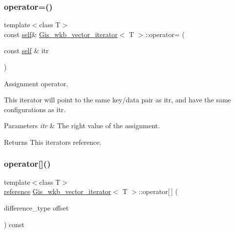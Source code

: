 \subsubsection{\texorpdfstring{operator=()}{operator=()}}
{\footnotesize\ttfamily template$<$class T$>$ \\
const \mbox{\hyperlink{classGis__wkb__vector__const__iterator}{self}}\& \mbox{\hyperlink{classGis__wkb__vector__iterator}{Gis\+\_\+wkb\+\_\+vector\+\_\+iterator}}$<$ T $>$\+::operator= (\begin{DoxyParamCaption}\item[{const \mbox{\hyperlink{classGis__wkb__vector__const__iterator}{self}} \&}]{itr }\end{DoxyParamCaption})\hspace{0.3cm}{\ttfamily [inline]}}



Assignment operator. 

This iterator will point to the same key/data pair as itr, and have the same configurations as itr. 
\begin{DoxyParams}{Parameters}
{\em itr} & The right value of the assignment. \\
\hline
\end{DoxyParams}
\begin{DoxyReturn}{Returns}
This iterator\textquotesingle{}s reference. 
\end{DoxyReturn}
\mbox{\label{classGis__wkb__vector__iterator_ad01cffdabb26e97f3024db61e24b6702}} 
\subsubsection{\texorpdfstring{operator[]()}{operator[]()}}
{\footnotesize\ttfamily template$<$class T$>$ \\
\mbox{\hyperlink{classGis__wkb__vector__const__iterator_a320ffe7a48e9c6440eb76d321ff8c5a2}{reference}} \mbox{\hyperlink{classGis__wkb__vector__iterator}{Gis\+\_\+wkb\+\_\+vector\+\_\+iterator}}$<$ T $>$\+::operator\mbox{[}$\,$\mbox{]} (\begin{DoxyParamCaption}\item[{difference\+\_\+type}]{offset }\end{DoxyParamCaption}) const\hspace{0.3cm}{\ttfamily [inline]}}



